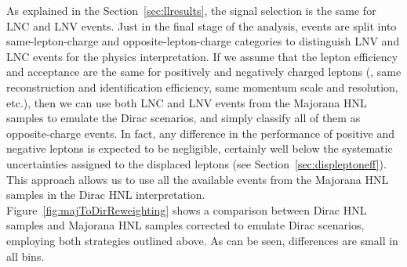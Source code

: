 As explained in the Section~\ref{sec:llresults}, the signal selection is the
same for LNC and LNV events. Just in the final stage of the analysis,
events are split into same-lepton-charge and opposite-lepton-charge
categories to distinguish LNV and LNC events for the physics
interpretation. If we assume that the lepton efficiency and
acceptance are the same for positively and negatively charged leptons
(\ie, same reconstruction and identification efficiency, same momentum
scale and resolution, etc.), then we can use both LNC and LNV events
from the Majorana HNL samples to emulate the Dirac scenarios, and
simply classify all of them as opposite-charge events. In fact, any
difference in the performance of positive and negative leptons is
expected to be negligible, certainly well below the systematic
uncertainties assigned to the displaced leptons (see
Section~\ref{sec:displeptoneff}).
This approach allows us to use all the available events from the
Majorana HNL samples in the Dirac HNL interpretation.\\
Figure~\ref{fig:majToDirReweighting} shows a comparison between Dirac
HNL samples and Majorana HNL samples corrected to emulate Dirac
scenarios, employing both strategies outlined above.
As can be seen, differences are small in all bins.

